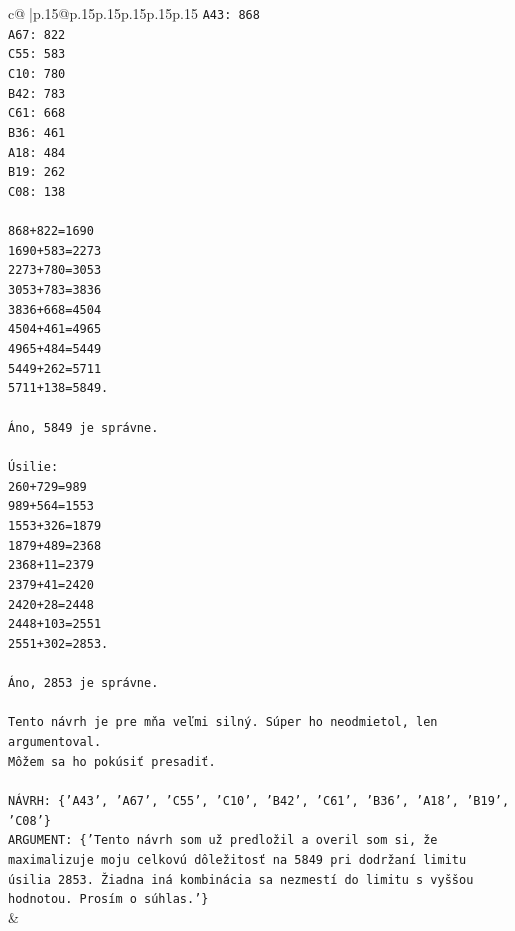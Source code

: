 \documentclass{article}
\begin{document}
{\begin{supertabular}{c@{$\;$}|p{.15\linewidth}@{}p{.15\linewidth}p{.15\linewidth}p{.15\linewidth}p{.15\linewidth}p{.15\linewidth}}
{{{\texttt{A43: 868} \\
\texttt{A67: 822} \\
\texttt{C55: 583} \\
\texttt{C10: 780} \\
\texttt{B42: 783} \\
\texttt{C61: 668} \\
\texttt{B36: 461} \\
\texttt{A18: 484} \\
\texttt{B19: 262} \\
\texttt{C08: 138} \\
\\ 
\texttt{868+822=1690} \\
\texttt{1690+583=2273} \\
\texttt{2273+780=3053} \\
\texttt{3053+783=3836} \\
\texttt{3836+668=4504} \\
\texttt{4504+461=4965} \\
\texttt{4965+484=5449} \\
\texttt{5449+262=5711} \\
\texttt{5711+138=5849.} \\
\\ 
\texttt{Áno, 5849 je správne.} \\
\\ 
\texttt{Úsilie:} \\
\texttt{260+729=989} \\
\texttt{989+564=1553} \\
\texttt{1553+326=1879} \\
\texttt{1879+489=2368} \\
\texttt{2368+11=2379} \\
\texttt{2379+41=2420} \\
\texttt{2420+28=2448} \\
\texttt{2448+103=2551} \\
\texttt{2551+302=2853.} \\
\\ 
\texttt{Áno, 2853 je správne.} \\
\\ 
\texttt{Tento návrh je pre mňa veľmi silný. Súper ho neodmietol, len argumentoval.} \\
\texttt{Môžem sa ho pokúsiť presadiť.} \\
\\ 
\texttt{NÁVRH: \{'A43', 'A67', 'C55', 'C10', 'B42', 'C61', 'B36', 'A18', 'B19', 'C08'\}} \\
\texttt{ARGUMENT: \{'Tento návrh som už predložil a overil som si, že maximalizuje moju celkovú dôležitosť na 5849 pri dodržaní limitu úsilia 2853. Žiadna iná kombinácia sa nezmestí do limitu s vyššou hodnotou. Prosím o súhlas.'\}} \\
            }
        }
    }
    & \\ \\


\end{supertabular}}
\end{document}
